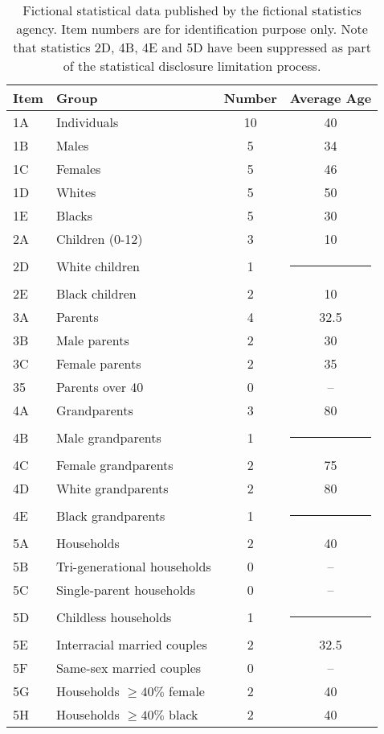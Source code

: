 \documentclass[runningheads]{llncs}
\begin{document}
\begin{table}
\begin{center}
\begin{tabular}{l|l|c|c}
Item & Group & Number & Average Age \\
\hline
1A & Individuals & 10 & 40 \\
1B & Males & 5 & 34 \\
1C & Females & 5 & 46 \\
1D & Whites & 5 & 50 \\
1E & Blacks & 5 & 30 \\
\hline
2A & Children (0-12) & 3 & 10 \\
2D & White children & 1 & \multicolumn{1}{c}{\rule{6mm}{3mm}} \\
2E & Black children & 2 & 10 \\
\hline
3A & Parents & 4 & 32.5 \\
3B & Male parents & 2 & 30 \\
3C & Female parents & 2 & 35 \\
35 & Parents over 40 & 0 & -- \\
\hline
4A & Grandparents & 3 & 80 \\
4B & Male grandparents & 1 & \multicolumn{1}{c}{\rule{6mm}{3mm}} \\
4C & Female grandparents & 2 & 75 \\
4D & White grandparents & 2 & 80 \\
4E & Black grandparents & 1 & \multicolumn{1}{c}{\rule{6mm}{3mm}} \\
\hline
5A & Households & 2 & 40 \\
5B & Tri-generational households & 0 & -- \\
5C & Single-parent households & 0 & -- \\
5D & Childless households & 1 & \multicolumn{1}{c}{\rule{6mm}{3mm}} \\
5E & Interracial married couples & 2 & 32.5 \\
5F & Same-sex married couples & 0 & -- \\
5G & Households $\geq 40\% $ female & 2 & 40 \\
5H & Households $\geq 40\% $ black & 2 & 40 \\
\hline
\end{tabular}
\end{center}
\caption{Fictional statistical data published by the fictional
  statistics agency. Item numbers are for identification purpose
  only. Note that statistics 2D, 4B, 4E and 5D have been suppressed as part
  of the statistical disclosure limitation process.}\label{publishedstatsbig}
\end{table}
\end{document}
